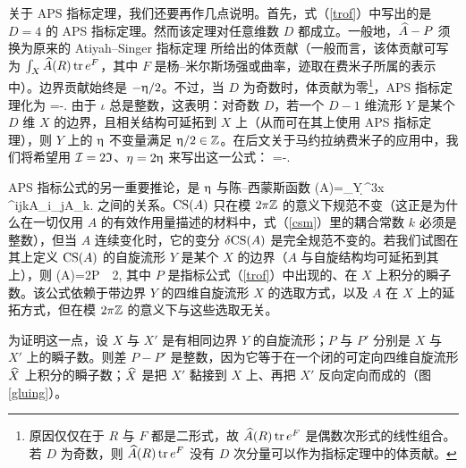 关于 APS 指标定理，我们还要再作几点说明。首先，式（\ref{trof}）中写出的是 $D=4$ 的 APS 指标定理。然而该定理对任意维数 $D$ 都成立。一般地，${\widehat A}-P$ 须换为原来的 Atiyah--Singer 指标定理 \cite{ASfirst,AS} 所给出的体贡献（一般而言，该体贡献可写为 $\int_X{\widehat A}(R)\,{\mathrm {tr}} \,e^F$，其中 $F$ 是杨--米尔斯场强或曲率，迹取在费米子所属的表示中）。边界贡献始终是 $-\upeta/2$。不过，当 $D$ 为奇数时，体贡献为零\footnote{原因仅仅在于 $R$ 与 $F$ 都是二形式，故 ${\widehat A}(R)\,{\mathrm {tr}}\,e^F$ 是偶数次形式的线性组合。若 $D$ 为奇数，则 ${\widehat A}(R)\,{\mathrm {tr}}\,e^F$ 没有 $D$ 次分量可以作为指标定理中的体贡献。}，APS 指标定理化为
\be\label{zolg} \iota=-. \ee
由于 $\iota$ 总是整数，这表明：对奇数 $D$，若一个 $D-1$ 维流形 $Y$ 是某个 $D$ 维 $X$ 的边界，且相关结构可延拓到 $X$ 上（从而可在其上使用 APS 指标定理），则 $Y$ 上的 $\upeta$ 不变量满足 $\upeta/2\in{\mathbb{Z}}$。在后文关于马约拉纳费米子的应用中，我们将希望用 ${\mathcal I}=2{\mathfrak I}$、$\eta=2\upeta$ 来写出这一公式：
\be\label{molg}\I=-. \ee


APS 指标公式的另一重要推论，是 $\upeta$ 与陈--西蒙斯函数
\be\label{zerf}\ICS(A)=\int_Y\,\d^3x \,\epsilon^{ijk}A_i\partial_jA_k. \ee
之间的关系。${\mathrm{CS}}(A)$ 只在模 $2\pi{\mathbb{Z}}$ 的意义下规范不变（这正是为什么在一切仅用 $A$ 的有效作用量描述的材料中，式（\ref{csm}）里的耦合常数 $k$ 必须是整数），但当 $A$ 连续变化时，它的变分 $\delta{\mathrm{CS}}(A)$ 是完全规范不变的。若我们试图在其上定义 ${\mathrm{CS}}(A)$ 的自旋流形 $Y$ 是某个 $X$ 的边界（$A$ 与自旋结构均可延拓到其上），则
\be\label{xerf}\ICS(A)=2\pi P~{}~2\pi\Z, \ee
其中 $P$ 是指标公式（\ref{trof}）中出现的、在 $X$ 上积分的瞬子数。该公式依赖于带边界 $Y$ 的四维自旋流形 $X$ 的选取方式，以及 $A$ 在 $X$ 上的延拓方式，但在模 $2\pi{\mathbb{Z}}$ 的意义下与这些选取无关。

为证明这一点，设 $X$ 与 $X'$ 是有相同边界 $Y$ 的自旋流形；$P$ 与 $P'$ 分别是 $X$ 与 $X'$ 上的瞬子数。则差 $P-P'$ 是整数，因为它等于在一个闭的可定向四维自旋流形 $\widehat X$ 上积分的瞬子数；$\widehat X$ 是把 $X'$ 黏接到 $X$ 上、再把 $X'$ 反向定向而成的（图 \ref{gluing}）。

